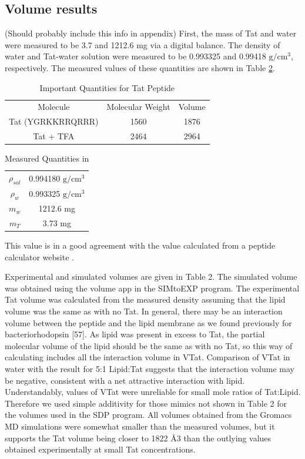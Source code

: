\subsection{Volume results}
(Should probably include this info in appendix)
First, the mass of Tat and water were measured to be 
3.7 and 1212.6 mg via a digital balance. The density of water and 
Tat-water solution were measured to be 0.993325 and 0.99418 $\mathrm{g/cm^3}$,
respectively. The measured values of these quantities
are shown in Table \ref{tb:values}.
\begin{table}[ht]
  \centering
  \begin{tabular}{c c c}
    Molecule & Molecular Weight & Volume \\
    Tat (YGRKKRRQRRR) & 1560 & 1876 \\ 
    Tat + TFA & 2464 & 2964
  \end{tabular}
  \caption{Important Quantities for Tat Peptide}
  \label{tb:Tat}
\end{table}
\begin{table}[ht]
  \centering
  \begin{tabular}{c c}
    $\rho_{sol}$ & 0.994180 $\mathrm{g/cm^3}$\\
    $\rho_w$ & 0.993325 $\mathrm{g/cm^3}$\\
    $m_w$ & 1212.6 mg \\
    $m_T$ & 3.73 mg \\ 
  \end{tabular}
  \caption{Measured Quantities in }
  \label{tb:values}
\end{table}
This value is in a good agreement with the 
value calculated from a peptide calculator website \cite{}. 

Experimental and simulated volumes are given in Table 2. The simulated volume was
obtained using the volume app in the SIMtoEXP program. The experimental Tat volume was
calculated from the measured density assuming that the lipid volume was the same as with no
Tat. In general, there may be an interaction volume between the peptide and the lipid membrane
as we found previously for bacteriorhodopsin [57]. As lipid was present in excess to Tat, the
partial molecular volume of the lipid should be the same as with no Tat, so this way of
calculating includes all the interaction volume in VTat. Comparison of VTat in water with the
result for 5:1 Lipid:Tat suggests that the interaction volume may be negative, consistent with a
net attractive interaction with lipid. Understandably, values of VTat were unreliable for small
mole ratios of Tat:Lipid. Therefore we used simple additivity for those mimics not shown in
Table 2 for the volumes used in the SDP program. All volumes obtained from the Gromacs MD
simulations were somewhat smaller than the measured volumes, but it supports the Tat volume
being closer to 1822 Å3 than the outlying values obtained experimentally at small Tat
concentrations.

